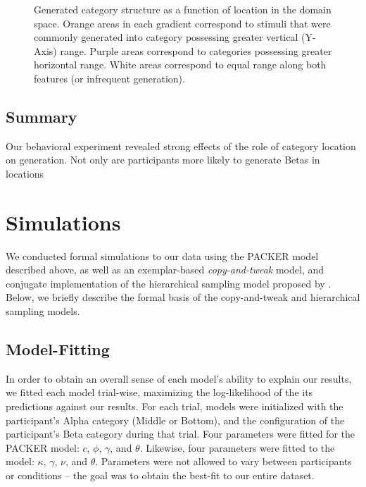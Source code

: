 \documentclass[10pt,letterpaper]{article}
\newcommand\inputpgf[2]{{
\let\pgfimageWithoutPath\pgfimage
\renewcommand{\pgfimage}[2][]{\pgfimageWithoutPath[##1]{#1/##2}}

}}
\begin{document}
\begin{figure}[ht!]
    \begin{center}
    \inputpgf{figs/}{range-diff-gradient.pgf}
    \caption{Generated category structure as a function of location in the domain space. Orange areas in each gradient correspond to stimuli that were commonly generated into category possessing greater vertical (Y-Axis) range. Purple areas correspond to categories possessing greater horizontal range. White areas correspond to equal range along both features (or infrequent generation).}
    \label{fig:range-diff-gradient}
    \end{center}
\end{figure}

\subsection{Summary}

Our behavioral experiment revealed strong effects of the role of category location on generation. Not only are participants more likely to generate Betas in locations

\section{Simulations}

We conducted formal simulations to our data using the PACKER model described above, as well as an exemplar-based \textit{copy-and-tweak} model, and conjugate implementation of the hierarchical sampling model proposed by \citet{jern2013probabilistic}. Below, we briefly describe the formal basis of the copy-and-tweak and hierarchical sampling models.


\subsection{Model-Fitting}
In order to obtain an overall sense of each model's ability to explain our results, we fitted each model trial-wise, maximizing the log-likelihood of the its predictions against our results. For each trial, models were initialized with the participant's Alpha category (Middle or Bottom), and the configuration of the participant's Beta category during that trial. Four parameters were fitted for the PACKER model: $c$, $\phi$, $\gamma$, and $\theta$. Likewise, four parameters were fitted to the \cite{jern2013probabilistic} model: $\kappa$, $\gamma$, $\nu$, and $\theta$. Parameters were not allowed to vary between participants or conditions -- the goal was to obtain the best-fit to our entire dataset.
\end{document}

